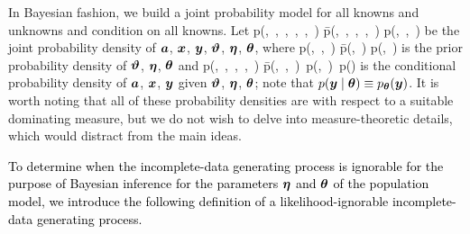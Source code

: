 \documentclass[12pt,usenatbib,referee]{article}
\renewcommand{\alert}{\textcolor{black}}
\begin{document}
In Bayesian fashion,
we build a joint probability model for all knowns and unknowns and condition on all knowns.
Let
\bea
\label{joint}
p(\baa,\, \bx,\, \by,\, \bvartheta,\, \bta,\, \btheta) 
\= p(\baa,\, \bx,\, \by \mid \bvartheta,\, \bta,\, \btheta)\; p(\bvartheta,\, \bta,\, \btheta)
\eea
be the joint probability density of $\bm{a}$, $\bm{x}$, $\bm{y}$, $\boldsymbol{\vartheta}$, $\boldsymbol{\eta}$, $\boldsymbol{\theta}$,
where
\bea
\label{joint.prior}
p(\bvartheta,\, \bta,\, \btheta) 
\= p(\bvartheta \mid \bta,\, \btheta)\; p(\bta,\, \btheta)
\eea
is the prior probability density of $\boldsymbol{\vartheta}$, $\boldsymbol{\eta}$, $\boldsymbol{\theta}$ and
\bea
\label{joint.pdf}
p(\baa,\, \bx,\, \by \mid \bvartheta,\, \bta,\, \btheta) 
\= p(\baa \mid \bx,\, \by,\, \bvartheta)\, p(\bx \mid \by,\, \bta)\, p(\by \mid \btheta)
\eea
is the conditional probability density of $\bm{a}$, $\bm{x}$, $\bm{y}$ given $\boldsymbol{\vartheta}$, $\boldsymbol{\eta}$, $\boldsymbol{\theta}$;
note that $p(\bm{y} \mid \boldsymbol{\theta}) \equiv p_{\boldsymbol{\theta}}(\bm{y})$.
It is worth noting that all of these probability densities are with respect to a suitable dominating measure,
but we do not wish to delve into measure-theoretic details,
which would distract from the main ideas.

\alert{To determine when the incomplete-data generating process is ignorable for the purpose of Bayesian inference for the parameters $\boldsymbol{\eta}$ and $\boldsymbol{\theta}$ of the population model,
we introduce the following definition of a likelihood-ignorable incomplete-data generating process.}\s
\end{document}
